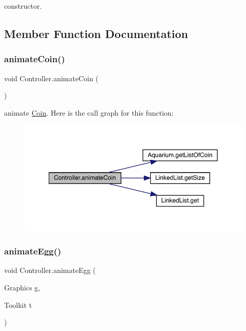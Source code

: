 constructor. 

\subsection{Member Function Documentation}
\mbox{\label{class_controller_a2996989c163af44339ea43f597b77115}} 
\subsubsection{\texorpdfstring{animate\+Coin()}{animateCoin()}}
{\footnotesize\ttfamily void Controller.\+animate\+Coin (\begin{DoxyParamCaption}{ }\end{DoxyParamCaption})\hspace{0.3cm}{\ttfamily [inline]}}

animate \mbox{\hyperlink{class_coin}{Coin}}. Here is the call graph for this function\+:
\nopagebreak
\begin{figure}[H]
\begin{center}
\leavevmode
\includegraphics[width=350pt]{class_controller_a2996989c163af44339ea43f597b77115_cgraph}
\end{center}
\end{figure}
\mbox{\label{class_controller_a04e239635c1b5ca996b74498c373626b}} 
\subsubsection{\texorpdfstring{animate\+Egg()}{animateEgg()}}
{\footnotesize\ttfamily void Controller.\+animate\+Egg (\begin{DoxyParamCaption}\item[{Graphics}]{g,  }\item[{Toolkit}]{t }\end{DoxyParamCaption})\hspace{0.3cm}{\ttfamily [inline]}}

